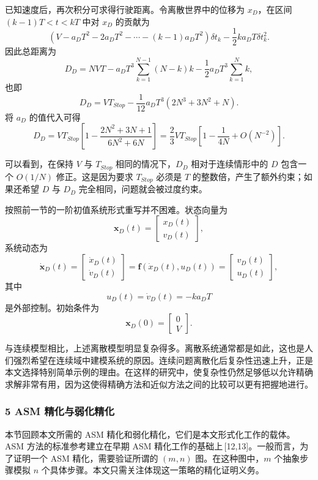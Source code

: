 {\indent 已知速度后，再次积分可求得行驶距离。令离散世界中的位移为 $x_D$，在区间 $(k-1)T<t<kT$ 中对 $x_D$ 的贡献为
\[
\left(V-a_DT^2-2a_DT^2-\cdots-(k-1)a_DT^2\right)\delta t_k
-\frac{1}{2}ka_DT\delta t_k^2 .
\]
因此总距离为
\[
D_D=NV T
-a_DT^3\sum_{k=1}^{N-1}(N-k)k
-\frac{1}{2}a_DT^3\sum_{k=1}^{N}k ,
\]
也即
\[
D_D=VT_{Stop}
-\frac{1}{12}a_DT^3(2N^3+3N^2+N).
\]
将 $a_D$ 的值代入可得
\[
D_D
=VT_{Stop}\left[1-\frac{2N^2+3N+1}{6N^2+6N}\right]
=\frac{2}{3}VT_{Stop}\left[1-\frac{1}{4N}+O(N^{-2})\right].
\]

\indent 可以看到，在保持 $V$ 与 $T_{Stop}$ 相同的情况下，$D_D$ 相对于连续情形中的 $D$ 包含一个 $O(1/N)$ 修正。这是因为要求 $T_{Stop}$ 必须是 $T$ 的整数倍，产生了额外约束；如果还希望 $D$ 与 $D_D$ 完全相同，问题就会被过度约束。

\indent 按照前一节的一阶初值系统形式重写并不困难。状态向量为
\[
\mathbf{x}_D(t)=
\begin{bmatrix}
x_D(t)\\
v_D(t)
\end{bmatrix},
\]
系统动态为
\[
\dot{\mathbf{x}}_D(t)=
\begin{bmatrix}
\dot{x}_D(t)\\
\dot{v}_D(t)
\end{bmatrix}
=\mathbf{f}(\dot{x}_D(t),u_D(t))
=
\begin{bmatrix}
v_D(t)\\
u_D(t)
\end{bmatrix},
\]
其中
\[
u_D(t)=\dot{v}_D(t)=-ka_DT
\]
是外部控制。初始条件为
\[
\mathbf{x}_D(0)=
\begin{bmatrix}
0\\
V
\end{bmatrix}.
\]

\indent 与连续模型相比，上述离散模型明显复杂得多。离散系统通常都是如此，这也是人们强烈希望在连续域中建模系统的原因。连续问题离散化后复杂性迅速上升，正是本文选择特别简单示例的理由。在这样的研究中，使复杂性仍然足够低以允许精确求解非常有用，因为这使得精确方法和近似方法之间的比较可以更有把握地进行。

\subsubsection*{5 ASM 精化与弱化精化}

\indent 本节回顾本文所需的 ASM 精化和弱化精化，它们是本文形式化工作的载体。ASM 方法的标准参考建立在早期 ASM 精化工作的基础上\,[12,13]。一般而言，为了证明一个 ASM 精化，需要验证所谓的 $(m,n)$ 图。在这种图中，$m$ 个抽象步骤模拟 $n$ 个具体步骤。本文只需关注体现这一策略的精化证明义务。

}
